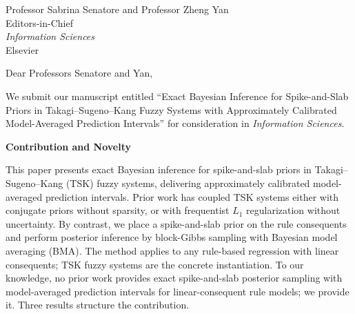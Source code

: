 \documentclass[11pt]{letter}
\begin{document}
\begin{letter}{Professor Sabrina Senatore and Professor Zheng Yan \\ Editors-in-Chief \\ \textit{Information Sciences} \\ Elsevier}

\opening{Dear Professors Senatore and Yan,}

We submit our manuscript entitled ``Exact Bayesian Inference for Spike-and-Slab Priors in Takagi--Sugeno--Kang Fuzzy Systems with Approximately Calibrated Model-Averaged Prediction Intervals'' for consideration in \textit{Information Sciences}.

\noindent\textbf{Contribution and Novelty}

This paper presents exact Bayesian inference for spike-and-slab priors in Takagi--Sugeno--Kang (TSK) fuzzy systems, delivering approximately calibrated model-averaged prediction intervals.
Prior work has coupled TSK systems either with conjugate priors without sparsity, or with frequentist $L_1$ regularization without uncertainty.
By contrast, we place a spike-and-slab prior on the rule consequents and perform posterior inference by block-Gibbs sampling with Bayesian model averaging (BMA). The method applies to any rule-based regression with linear consequents; TSK fuzzy systems are the concrete instantiation.
To our knowledge, no prior work provides exact spike-and-slab posterior sampling with model-averaged prediction intervals for linear-consequent rule models; we provide it. Three results structure the contribution.


\end{letter}
\end{document}
